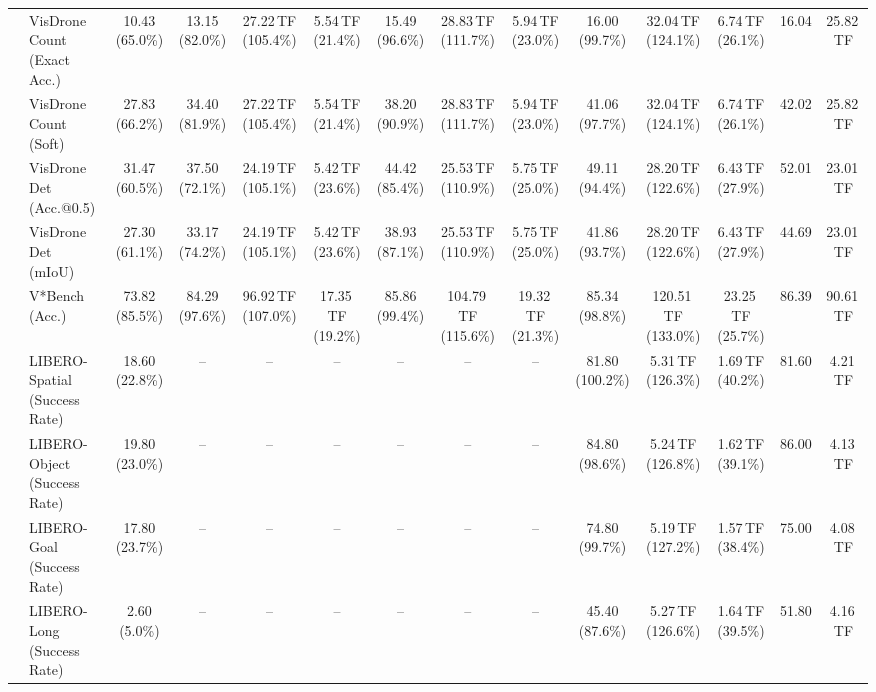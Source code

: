 \begin{table}[t]
\begin{center}
\begin{small}
\begin{sc}
{\begin{tabular}{llcccccccccccc}
& VisDrone Count (Exact Acc.) & 10.43 (65.0\%) & 13.15 (82.0\%) & 27.22\,TF (105.4\%) & 5.54\,TF (21.4\%) & 15.49 (96.6\%) & 28.83\,TF (111.7\%) & 5.94\,TF (23.0\%) & 16.00 (99.7\%) & 32.04\,TF (124.1\%) & 6.74\,TF (26.1\%) & 16.04 & 25.82\,TF \\
& VisDrone Count (Soft) & 27.83 (66.2\%) & 34.40 (81.9\%) & 27.22\,TF (105.4\%) & 5.54\,TF (21.4\%) & 38.20 (90.9\%) & 28.83\,TF (111.7\%) & 5.94\,TF (23.0\%) & 41.06 (97.7\%) & 32.04\,TF (124.1\%) & 6.74\,TF (26.1\%) & 42.02 & 25.82\,TF \\
& VisDrone Det (Acc.@0.5) & 31.47 (60.5\%) & 37.50 (72.1\%) & 24.19\,TF (105.1\%) & 5.42\,TF (23.6\%) & 44.42 (85.4\%) & 25.53\,TF (110.9\%) & 5.75\,TF (25.0\%) & 49.11 (94.4\%) & 28.20\,TF (122.6\%) & 6.43\,TF (27.9\%) & 52.01 & 23.01\,TF \\
& VisDrone Det (mIoU) & 27.30 (61.1\%) & 33.17 (74.2\%) & 24.19\,TF (105.1\%) & 5.42\,TF (23.6\%) & 38.93 (87.1\%) & 25.53\,TF (110.9\%) & 5.75\,TF (25.0\%) & 41.86 (93.7\%) & 28.20\,TF (122.6\%) & 6.43\,TF (27.9\%) & 44.69 & 23.01\,TF \\
& V*Bench (Acc.) & 73.82 (85.5\%) & 84.29 (97.6\%) & 96.92\,TF (107.0\%) & 17.35\,TF (19.2\%) & 85.86 (99.4\%) & 104.79\,TF (115.6\%) & 19.32\,TF (21.3\%) & 85.34 (98.8\%) & 120.51\,TF (133.0\%) & 23.25\,TF (25.7\%) & 86.39 & 90.61\,TF \\
\midrule\midrule
{}
& LIBERO-Spatial (Success Rate) & 18.60 (22.8\%) & -- & -- & -- & -- & -- & -- & 81.80 (100.2\%) & 5.31\,TF (126.3\%) & 1.69\,TF (40.2\%) & 81.60 & 4.21\,TF \\
& LIBERO-Object (Success Rate) & 19.80 (23.0\%) & -- & -- & -- & -- & -- & -- & 84.80 (98.6\%) & 5.24\,TF (126.8\%) & 1.62\,TF (39.1\%) & 86.00 & 4.13\,TF \\
& LIBERO-Goal (Success Rate) & 17.80 (23.7\%) & -- & -- & -- & -- & -- & -- & 74.80 (99.7\%) & 5.19\,TF (127.2\%) & 1.57\,TF (38.4\%) & 75.00 & 4.08\,TF \\
& LIBERO-Long (Success Rate) & 2.60 (5.0\%) & -- & -- & -- & -- & -- & -- & 45.40 (87.6\%) & 5.27\,TF (126.6\%) & 1.64\,TF (39.5\%) & 51.80 & 4.16\,TF \\
\bottomrule
\end{tabular}}
\end{sc}\end{small}\end{center}
\vspace{-0.22in}
\end{table}
